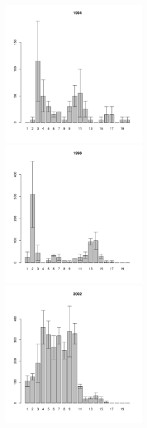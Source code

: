 \begin{figure}[ht]

\begin{multicols}{3}
\hfill
\includegraphics[width=60mm]{../White_Sea/Ryashkov_ZRS/zrs_1994_.pdf}
\hfill
\includegraphics[width=60mm]{../White_Sea/Ryashkov_ZRS/zrs_1998_.pdf}
\hfill
\includegraphics[width=60mm]{../White_Sea/Ryashkov_ZRS/zrs_2002_.pdf}
\end{multicols}




\end{figure}
